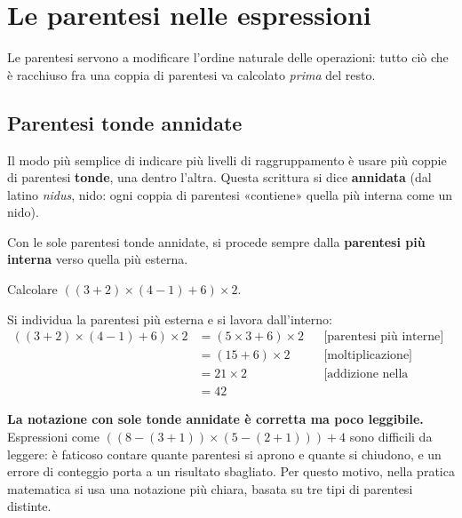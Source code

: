 \section{Le parentesi nelle espressioni}

Le parentesi servono a modificare l'ordine naturale delle operazioni:
tutto ciò che è racchiuso fra una coppia di parentesi va calcolato
\emph{prima} del resto.

\subsection{Parentesi tonde annidate}

Il modo più semplice di indicare più livelli di raggruppamento è usare
più coppie di parentesi \textbf{tonde}, una dentro l'altra.
Questa scrittura si dice \textbf{annidata} (dal latino \emph{nidus}, nido:
ogni coppia di parentesi «contiene» quella più interna come un nido).

\begin{regola}
    Con le sole parentesi tonde annidate, si procede sempre dalla
    \textbf{parentesi più interna} verso quella più esterna.
\end{regola}

\begin{esempio}
    Calcolare $((3 + 2) \times (4 - 1) + 6) \times 2$.

    Si individua la parentesi più esterna e si lavora dall'interno:
    \begin{align*}
        ((3 + 2) \times (4 - 1) + 6) \times 2
         & = (5 \times 3 + 6) \times 2 &  & \text{[parentesi più interne]}     \\
         & = (15 + 6) \times 2         &  & \text{[moltiplicazione]}           \\
         & = 21 \times 2               &  & \text{[addizione nella parentesi]} \\
         & = 42
    \end{align*}
\end{esempio}

\begin{attenzione}
    \textbf{La notazione con sole tonde annidate è corretta ma poco leggibile.}
    Espressioni come $((8-(3+1))\times(5-(2+1)))+4$ sono difficili da leggere:
    è faticoso contare quante parentesi si aprono e quante si chiudono,
    e un errore di conteggio porta a un risultato sbagliato.
    Per questo motivo, nella pratica matematica si usa una notazione più chiara,
    basata su tre tipi di parentesi distinte.
\end{attenzione}

